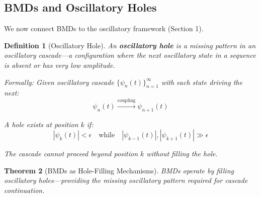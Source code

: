 \documentclass[11pt]{article}
\newtheorem{theorem}{Theorem}[section]
\newtheorem{definition}[theorem]{Definition}
\theoremstyle{remark}
\begin{document}
\subsection{BMDs and Oscillatory Holes}

We now connect BMDs to the oscillatory framework (Section 1).

\begin{definition}[Oscillatory Hole]
\label{def:oscillatory_hole}
An \textbf{oscillatory hole} is a missing pattern in an oscillatory cascade—a configuration where the next oscillatory state in a sequence is absent or has very low amplitude.

Formally: Given oscillatory cascade $\{\psi_n(t)\}_{n=1}^{\infty}$ with each state driving the next:
\begin{equation}
\psi_n(t) \xrightarrow{\text{coupling}} \psi_{n+1}(t)
\end{equation}

A hole exists at position $k$ if:
\begin{equation}
|\psi_k(t)| < \epsilon \quad \text{while} \quad |\psi_{k-1}(t)|, |\psi_{k+1}(t)| \gg \epsilon
\end{equation}

The cascade cannot proceed beyond position $k$ without filling the hole.
\end{definition}

\begin{theorem}[BMDs as Hole-Filling Mechanisms]
\label{thm:bmd_hole_filling}
BMDs operate by filling oscillatory holes—providing the missing oscillatory pattern required for cascade continuation.
\end{theorem}
\end{document}
